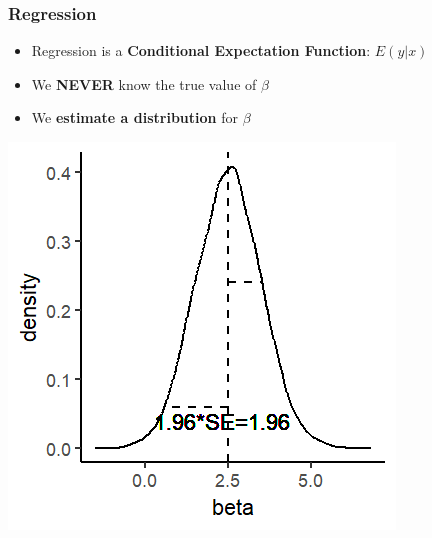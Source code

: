\documentclass[xcolor=x11names,compress]{beamer}\usepackage[]{graphicx}\usepackage[]{color}
\makeatletter
\def\maxwidth{ %
  \ifdim\Gin@nat@width>\linewidth
    \linewidth
  \else
    \Gin@nat@width
  \fi
}
\newenvironment{knitrout}{}{} %
\renewcommand{\(}{\begin{columns}}
\renewcommand{\)}{\end{columns}}
\newcommand{\<}[1]{\begin{column}{#1}}
\renewcommand{\>}{\end{column}}
\makeatother
\begin{document}
\begin{frame}
\frametitle{Regression}
\begin{itemize}
\item Regression is a \textbf{Conditional Expectation Function}: $E(y|x)$
\item We \textbf{NEVER} know the true value of $\beta$
\item We \textbf{estimate a distribution} for $\beta$
\end{itemize}
\begin{knitrout}
\color{fgcolor}
\includegraphics[width=\maxwidth]{figure/beta_dist4-1} 

\end{knitrout}
\end{frame}
\end{document}
